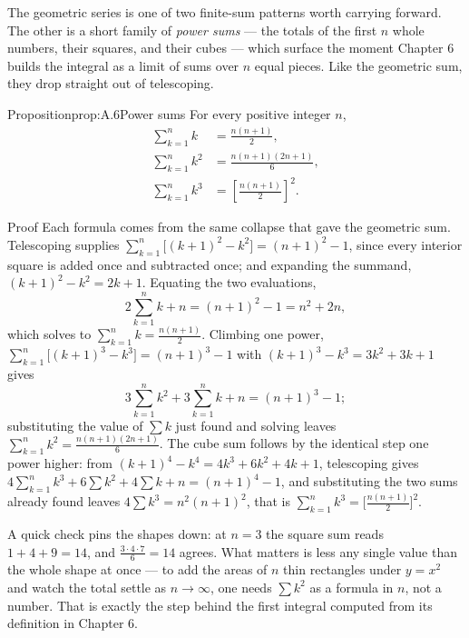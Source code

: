 \documentclass[a4paper,12pt,oneside]{memoir}
\begin{document}
The geometric series is one of two finite-sum patterns worth carrying forward. The other is a short family of \emph{power sums} — the totals of the first \(n\) whole numbers, their squares, and their cubes — which surface the moment Chapter 6 builds the integral as a limit of sums over \(n\) equal pieces. Like the geometric sum, they drop straight out of telescoping.

\begin{envproposition}{Proposition}{prop:A.6}{Power sums}
For every positive integer \(n\), \[ \begin{aligned}
        \sum_{k=1}^{n} k &= \frac{n(n+1)}{2}, \\[2pt]
        \sum_{k=1}^{n} k^{2} &= \frac{n(n+1)(2n+1)}{6}, \\[2pt]
        \sum_{k=1}^{n} k^{3} &= \left[\frac{n(n+1)}{2}\right]^{2}.
      \end{aligned} \]
\end{envproposition}
\begin{envproof}{Proof}{}{}
Each formula comes from the same collapse that gave the geometric sum. Telescoping supplies \(\sum_{k=1}^{n}\bigl[(k+1)^{2} - k^{2}\bigr] = (n+1)^{2} - 1\), since every interior square is added once and subtracted once; and expanding the summand, \((k+1)^{2} - k^{2} = 2k + 1\). Equating the two evaluations, \[ 2\sum_{k=1}^{n} k + n = (n+1)^{2} - 1 = n^{2} + 2n, \] which solves to \(\sum_{k=1}^{n} k = \tfrac{n(n+1)}{2}\). Climbing one power, \(\sum_{k=1}^{n}\bigl[(k+1)^{3} - k^{3}\bigr] = (n+1)^{3} - 1\) with \((k+1)^{3} - k^{3} = 3k^{2} + 3k + 1\) gives \[ 3\sum_{k=1}^{n} k^{2} + 3\sum_{k=1}^{n} k + n = (n+1)^{3} - 1; \] substituting the value of \(\sum k\) just found and solving leaves \(\sum_{k=1}^{n} k^{2} = \tfrac{n(n+1)(2n+1)}{6}\). The cube sum follows by the identical step one power higher: from \((k+1)^{4} - k^{4} = 4k^{3} + 6k^{2} + 4k + 1\), telescoping gives \(4\sum_{k=1}^{n} k^{3} + 6\sum k^{2} + 4\sum k + n = (n+1)^{4} - 1\), and substituting the two sums already found leaves \(4\sum k^{3} = n^{2}(n+1)^{2}\), that is \(\sum_{k=1}^{n} k^{3} = \bigl[\tfrac{n(n+1)}{2}\bigr]^{2}\). \qedmark
\end{envproof}
A quick check pins the shapes down: at \(n = 3\) the square sum reads \(1 + 4 + 9 = 14\), and \(\tfrac{3 \cdot 4 \cdot 7}{6} = 14\) agrees. What matters is less any single value than the whole shape at once — to add the areas of \(n\) thin rectangles under \(y = x^{2}\) and watch the total settle as \(n \to \infty\), one needs \(\sum k^{2}\) as a formula in \(n\), not a number. That is exactly the step behind the first integral computed from its definition in Chapter 6.
\end{document}
